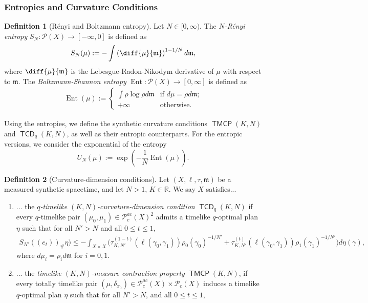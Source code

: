 \documentclass{article}
\newcommand{\R}{\mathbb{R}}
\newcommand{\m}{\mathfrak{m}}
\newcommand{\Pcal}{\mathcal{P}}
\DeclareMathOperator{\TCD}{\mathsf{TCD}}
\DeclareMathOperator{\TMCP}{\mathsf{TMCP}}
\DeclareMathOperator{\Ent}{Ent}
\theoremstyle{definition}
\newtheorem{defn}{Definition}[section]
\begin{document}
{\subsubsection{Entropies and Curvature Conditions}
\begin{defn}[R\'enyi and Boltzmann entropy] Let $N\in [0,\infty)$. The {\it $N$-R\'enyi entropy} $S_N:\Pcal(X)\to [-\infty,0]$ is defined as 
\begin{align}
S_N(\mu):= -\int \left(\diff{\mu}{\m}\right)^{1-1/N}d\m,
\end{align}
where $\diff{\mu}{\m}$ is the Lebesgue-Radon-Nikodym derivative of $\mu$ with respect to $\m$. The {\it Boltzmann-Shannon entropy} $\Ent: \Pcal(X)\to [0,\infty]$ is defined as 
\begin{align}
\Ent(\mu):=\begin{cases}
\displaystyle \int \rho \log\rho d\m & \text{if $d\mu = \rho d\m$;}\\
+\infty &\text{otherwise.}
\end{cases}
\end{align}
\end{defn}
Using the entropies, we define the synthetic curvature conditions $\TMCP(K,N)$ and $\TCD_q(K,N)$, as well as their entropic counterparts. For the entropic versions, we consider the exponential of the entropy
\[U_N(\mu):=\exp\left(-\frac{1}{N}\Ent(\mu)\right).\]
\begin{defn}[Curvature-dimension conditions] Let $(X,\ell, \tau, \m)$ be a measured synthetic spacetime, and let $N>1$, $K\in\R$. We say $X$ satisfies... 
\begin{enumerate}
\item ... the {\it $q$-timelike $(K,N)$-curvature-dimension condition} $\TCD_q(K,N)$ if every $q$-timelike pair $(\mu_0,\mu_1)\in \Pcal_c^{ac}(X)^2$ admits a timelike $q$-optimal plan $\eta$ such that for all $N'>N$ and all $0\leq t\leq 1$,
\begin{align}
S_{N'}((e_t))_\# \eta)\leq -\int_{X\times X} \Big(\tau_{K,N'}^{(1-t)}(\ell(\gamma_0,\gamma_1)) \rho_0(\gamma_0)^{-1/N'}+\tau_{K,N'}^{(t)}(\ell(\gamma_0,\gamma_1)) \rho_1(\gamma_1)^{-1/N'}\Big)d\eta(\gamma),
\end{align}
where $d\mu_i=\rho_id\m$ for $i=0,1$. 
\item ... the  {\it timelike $(K,N)$-measure contraction property} $\TMCP(K,N)$, if every totally timelike pair $(\mu,\delta_{x_0})\in\Pcal_c^{ac}(X)\times \Pcal_c(X)$ induces a timelike $q$-optimal plan $\eta$ such that for all $N'>N$, and all $0\leq t\leq 1$,  
\begin{align}

\end{align}
\end{enumerate}
\end{defn}}
\end{document}
